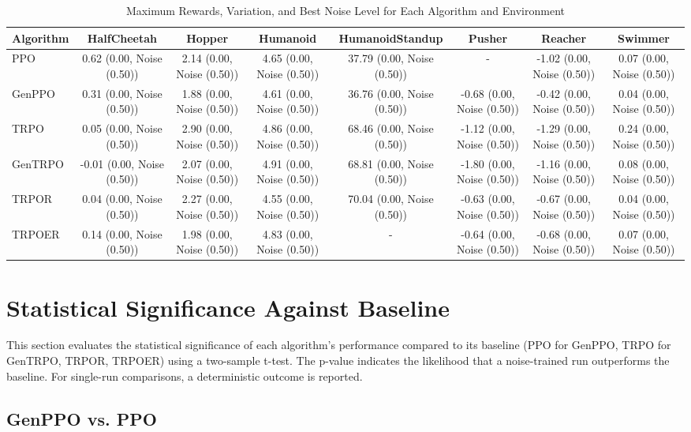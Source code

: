 \begin{table}[h]
\centering
\caption{Maximum Rewards, Variation, and Best Noise Level for Each Algorithm and Environment}
\label{tab:numerical_results}
\begin{tabular}{|l|c|c|c|c|c|c|c|}
\hline
Algorithm & HalfCheetah & Hopper & Humanoid & HumanoidStandup & Pusher & Reacher & Swimmer \\ \hline
PPO & 0.62 (0.00, Noise (0.50)) & 2.14 (0.00, Noise (0.50)) & 4.65 (0.00, Noise (0.50)) & 37.79 (0.00, Noise (0.50)) & - & -1.02 (0.00, Noise (0.50)) & 0.07 (0.00, Noise (0.50)) \\ \hline
GenPPO & 0.31 (0.00, Noise (0.50)) & 1.88 (0.00, Noise (0.50)) & 4.61 (0.00, Noise (0.50)) & 36.76 (0.00, Noise (0.50)) & -0.68 (0.00, Noise (0.50)) & -0.42 (0.00, Noise (0.50)) & 0.04 (0.00, Noise (0.50)) \\ \hline
TRPO & 0.05 (0.00, Noise (0.50)) & 2.90 (0.00, Noise (0.50)) & 4.86 (0.00, Noise (0.50)) & 68.46 (0.00, Noise (0.50)) & -1.12 (0.00, Noise (0.50)) & -1.29 (0.00, Noise (0.50)) & 0.24 (0.00, Noise (0.50)) \\ \hline
GenTRPO & -0.01 (0.00, Noise (0.50)) & 2.07 (0.00, Noise (0.50)) & 4.91 (0.00, Noise (0.50)) & 68.81 (0.00, Noise (0.50)) & -1.80 (0.00, Noise (0.50)) & -1.16 (0.00, Noise (0.50)) & 0.08 (0.00, Noise (0.50)) \\ \hline
TRPOR & 0.04 (0.00, Noise (0.50)) & 2.27 (0.00, Noise (0.50)) & 4.55 (0.00, Noise (0.50)) & 70.04 (0.00, Noise (0.50)) & -0.63 (0.00, Noise (0.50)) & -0.67 (0.00, Noise (0.50)) & 0.04 (0.00, Noise (0.50)) \\ \hline
TRPOER & 0.14 (0.00, Noise (0.50)) & 1.98 (0.00, Noise (0.50)) & 4.83 (0.00, Noise (0.50)) & - & -0.64 (0.00, Noise (0.50)) & -0.68 (0.00, Noise (0.50)) & 0.07 (0.00, Noise (0.50)) \\ \hline
\end{tabular}
\end{table}
\section{Statistical Significance Against Baseline}
This section evaluates the statistical significance of each algorithm’s performance compared to its baseline (PPO for GenPPO, TRPO for GenTRPO, TRPOR, TRPOER) using a two-sample t-test. The p-value indicates the likelihood that a noise-trained run outperforms the baseline. For single-run comparisons, a deterministic outcome is reported.
\subsection{GenPPO vs. PPO}
